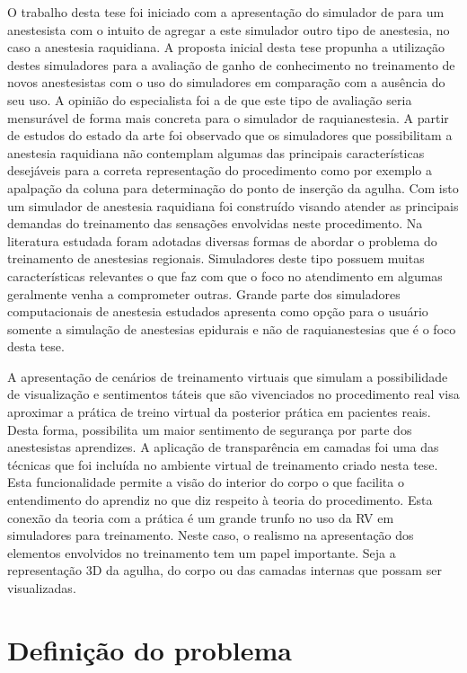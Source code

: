 O trabalho desta tese foi iniciado com a apresentação do simulador de \textcite{Brazil2017thesis} para um anestesista com o intuito de agregar a este simulador outro tipo de anestesia, no caso a anestesia raquidiana. A proposta inicial desta tese propunha a utilização destes simuladores para a avaliação de ganho de conhecimento no treinamento de novos anestesistas com o uso do simuladores em comparação com a ausência do seu uso. A opinião do especialista foi a de que este tipo de avaliação seria mensurável de forma mais concreta para o simulador de raquianestesia. A partir de estudos do estado da arte foi observado que os simuladores que possibilitam a anestesia raquidiana não contemplam algumas das principais características desejáveis para a correta representação do procedimento como por exemplo a apalpação da coluna para determinação do ponto de inserção da agulha. Com isto um simulador de anestesia raquidiana foi construído visando atender as principais demandas do treinamento das sensações envolvidas neste procedimento. Na literatura estudada foram adotadas diversas formas de abordar o problema do treinamento de anestesias regionais. Simuladores deste tipo possuem muitas características relevantes o que faz com que o foco no atendimento em algumas geralmente venha a comprometer outras. Grande parte dos simuladores computacionais de anestesia estudados apresenta como opção para o usuário somente a simulação de anestesias epidurais e não de raquianestesias que é o foco desta tese.

A apresentação de cenários de treinamento virtuais que simulam a possibilidade de visualização e sentimentos táteis que são vivenciados no procedimento real visa aproximar a prática de treino virtual da posterior prática em pacientes reais. Desta forma, possibilita um maior sentimento de segurança por parte dos anestesistas aprendizes. A aplicação de transparência em camadas foi uma das técnicas que foi incluída no ambiente virtual de treinamento criado nesta tese. Esta funcionalidade permite a visão do interior do corpo o que facilita o entendimento do aprendiz no que diz respeito à teoria do procedimento. Esta conexão da teoria com a prática é um grande trunfo no uso da \acrfull{RV} em simuladores para treinamento. Neste caso, o realismo na apresentação dos elementos envolvidos no treinamento tem um papel importante. Seja a representação 3D da agulha, do corpo ou das camadas internas que possam ser visualizadas. 

\section{Definição do problema}
\newtheorem{prob}{Problema}

